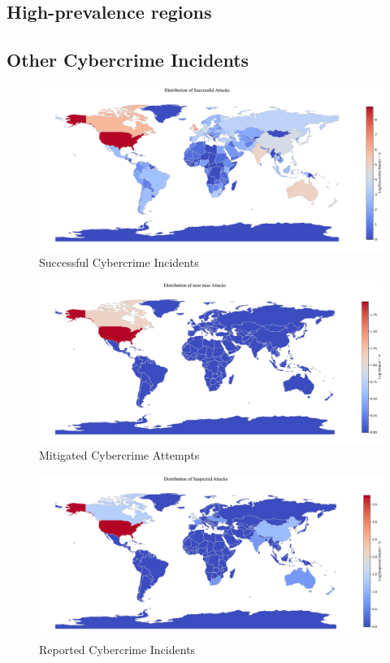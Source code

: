 \documentclass[12pt]{article}
\begin{document}
	\subsection{High-prevalence regions}\label{subsec:high-prevalence-regions} %
	\subsection{Other Cybercrime Incidents}\label{subsec:other-cybercrime-incedents} %

		\begin{figure}[htbp]
			\centering
			\includegraphics[width=1\textwidth]{./rsrc/Crime_Successful_distribution}
			\caption{Successful Cybercrime Incidents}\label{fig:successful-cybercrime-incidents}
		\end{figure}
		\begin{figure}[htbp]
			\centering
			\includegraphics[width=1\textwidth]{./rsrc/Crime_NearMiss_distribution}
			\caption{Mitigated Cybercrime Attempts}\label{fig:mitigated-cybercrime-attempts}
		\end{figure}
		\begin{figure}[htbp]
			\centering
			\includegraphics[width=1\textwidth]{./rsrc/Crime_Suspected_distribution}
			\caption{Reported Cybercrime Incidents}\label{fig:reported-cybercrime-incidents}
		\end{figure}
\end{document}
